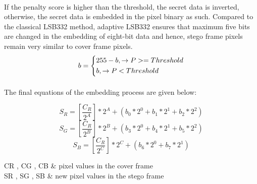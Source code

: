 {{        \paragraph{} If the penalty score is higher than the threshold, the secret data is inverted, otherwise, the secret data is embedded in the pixel binary as such. Compared to the classical LSB332 method, adaptive LSB332 ensures that maximum five bits are changed in the embedding of eight-bit data and hence, stego frame pixels remain very similar to cover frame pixels.
        \begin{equation}
            b = \begin{dcases}
                255-b, \to P >= Threshold\\
                b, \to P < Threshold
            \end{dcases}
        \end{equation}
        
        \paragraph{} The final equations of the embedding process are given below:
    }
    \begin{equation}
        S_R = [\frac{C_R}{2^A}] * 2^A + (b_0 * 2^0 + b_1 * 2^1 + b_2 * 2^2)
    \end{equation}
    \begin{equation}
        S_G = [\frac{C_R}{2^B}] * 2^B + (b_3 * 2^0 + b_4 * 2^1 + b_5 * 2^2)
    \end{equation}
    \begin{equation}
        S_B = [\frac{C_R}{2^C}] * 2^C + (b_6 * 2^0 + b_7 * 2^1)
    \end{equation}
    \begin{conditions}
        CR , CG , CB & pixel values in the cover frame\\
        SR , SG , SB & new pixel values in the stego frame
    \end{conditions}
}
